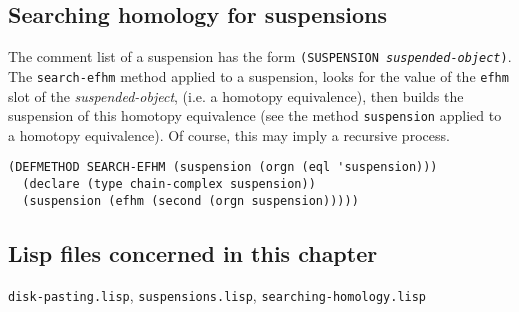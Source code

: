 \subsection {Searching homology for suspensions}

The comment list of a suspension has the
form {\tt (SUSPENSION {\em suspended-object})}.
The {\tt search-efhm} method applied to a suspension, looks for the value of the
{\tt efhm} slot of the {\em suspended-object}, (i.e. a homotopy equivalence), then
builds the suspension of this homotopy equivalence (see the method {\tt suspension} applied
to a homotopy equivalence). Of course, this may imply a recursive process.
{\footnotesize\begin{verbatim}
(DEFMETHOD SEARCH-EFHM (suspension (orgn (eql 'suspension)))
  (declare (type chain-complex suspension))
  (suspension (efhm (second (orgn suspension)))))
\end{verbatim}}

\subsection* {Lisp files concerned in this chapter}

{\tt disk-pasting.lisp}, {\tt suspensions.lisp}, {\tt searching-homology.lisp}
